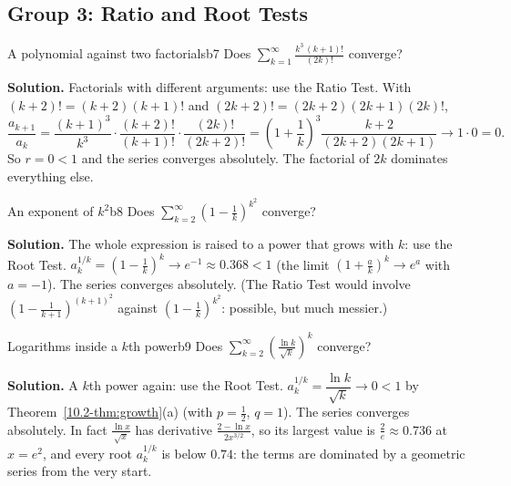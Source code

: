 \documentclass[11pt]{article}
\begin{document}
\subsection*{Group 3: Ratio and Root Tests}

\begin{exmp}{A polynomial against two factorials}{b7}
Does $\displaystyle\sum_{k=1}^\infty\frac{k^3\,(k+1)!}{(2k)!}$ converge?

\textbf{Solution.} Factorials with different arguments: use the Ratio Test. With $(k+2)!=(k+2)(k+1)!$ and $(2k+2)!=(2k+2)(2k+1)(2k)!$,
\[
\frac{a_{k+1}}{a_k}=\frac{(k+1)^3}{k^3}\cdot\frac{(k+2)!}{(k+1)!}\cdot\frac{(2k)!}{(2k+2)!}=\left(1+\frac1k\right)^3\frac{k+2}{(2k+2)(2k+1)}\to1\cdot0=0 .
\]
So $r=0<1$ and the series converges absolutely. The factorial of $2k$ dominates everything else.
\end{exmp}

\begin{exmp}{An exponent of $k^2$}{b8}
Does $\displaystyle\sum_{k=2}^\infty\left(1-\frac1k\right)^{k^2}$ converge?

\textbf{Solution.} The whole expression is raised to a power that grows with $k$: use the Root Test. $a_k^{1/k}=\left(1-\frac1k\right)^k\to e^{-1}\approx0.368<1$ (the limit $\left(1+\frac ak\right)^k\to e^a$ with $a=-1$). The series converges absolutely. (The Ratio Test would involve $\left(1-\frac1{k+1}\right)^{(k+1)^2}$ against $\left(1-\frac1k\right)^{k^2}$: possible, but much messier.)
\end{exmp}

\begin{exmp}{Logarithms inside a $k$th power}{b9}
Does $\displaystyle\sum_{k=2}^\infty\left(\frac{\ln k}{\sqrt k}\right)^k$ converge?

\textbf{Solution.} A $k$th power again: use the Root Test. $a_k^{1/k}=\dfrac{\ln k}{\sqrt k}\to0<1$ by Theorem~\ref{10.2-thm:growth}(a) (with $p=\frac12$, $q=1$). The series converges absolutely. In fact $\frac{\ln x}{\sqrt x}$ has derivative $\frac{2-\ln x}{2x^{3/2}}$, so its largest value is $\frac2e\approx0.736$ at $x=e^2$, and every root $a_k^{1/k}$ is below $0.74$: the terms are dominated by a geometric series from the very start.
\end{exmp}
\end{document}
